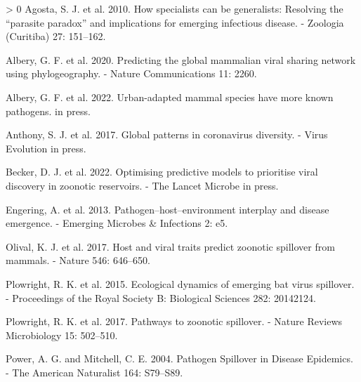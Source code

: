 \documentclass[11pt]{article}
\newlength{\cslhangindent}
\newenvironment{CSLReferences}[3] %
 {%
  \setlength{\parindent}{0pt}
  \ifodd #1 \everypar{\setlength{\hangindent}{\cslhangindent}}\ignorespaces\fi
  \ifnum #2 > 0
  \setlength{\parskip}{#2\baselineskip}
  \fi
 }%
 {}
\begin{document}
\hypertarget{refs}{}
\begin{CSLReferences}{1}{0}
\leavevmode\hypertarget{ref-Agosta2010HowSpe}{}%
Agosta, S. J. et al. 2010. How specialists can be generalists: Resolving
the {``parasite paradox''} and implications for emerging infectious
disease. - Zoologia (Curitiba) 27: 151--162.

\leavevmode\hypertarget{ref-Albery2020PreGlo}{}%
Albery, G. F. et al. 2020. Predicting the global mammalian viral sharing
network using phylogeography. - Nature Communications 11: 2260.

\leavevmode\hypertarget{ref-Albery2022UrbMam}{}%
Albery, G. F. et al. 2022. Urban-adapted mammal species have more known
pathogens. in press.

\leavevmode\hypertarget{ref-Anthony2017GloPat}{}%
Anthony, S. J. et al. 2017. Global patterns in coronavirus diversity. -
Virus Evolution in press.

\leavevmode\hypertarget{ref-Becker2022OptPre}{}%
Becker, D. J. et al. 2022. Optimising predictive models to prioritise
viral discovery in zoonotic reservoirs. - The Lancet Microbe in press.

\leavevmode\hypertarget{ref-Engering2013PatHos}{}%
Engering, A. et al. 2013. Pathogen--host--environment interplay and
disease emergence. - Emerging Microbes \& Infections 2: e5.

\leavevmode\hypertarget{ref-Olival2017HosVir}{}%
Olival, K. J. et al. 2017. Host and viral traits predict zoonotic
spillover from mammals. - Nature 546: 646--650.

\leavevmode\hypertarget{ref-Plowright2015EcoDyn}{}%
Plowright, R. K. et al. 2015. Ecological dynamics of emerging bat virus
spillover. - Proceedings of the Royal Society B: Biological Sciences
282: 20142124.

\leavevmode\hypertarget{ref-Plowright2017PatZoo}{}%
Plowright, R. K. et al. 2017. Pathways to zoonotic spillover. - Nature
Reviews Microbiology 15: 502--510.

\leavevmode\hypertarget{ref-Power2004PatSpi}{}%
Power, A. G. and Mitchell, C. E. 2004. Pathogen Spillover in Disease
Epidemics. - The American Naturalist 164: S79--S89.

\end{CSLReferences}
\end{document}

